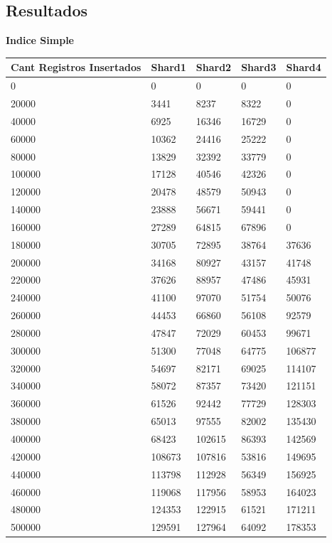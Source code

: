 \pagebreak

\subsection{Resultados}
\textbf{Indice Simple} \\
\begin{tabular}{ | l | l | l | l | l | }
\hline
	Cant Registros Insertados & Shard1 & Shard2 & Shard3 & Shard4 \\ \hline
	0 & 0 & 0 & 0 & 0 \\ \hline
	20000 & 3441 & 8237 & 8322 & 0 \\ \hline
	40000 & 6925 & 16346 & 16729 & 0 \\ \hline
	60000 & 10362 & 24416 & 25222 & 0 \\ \hline
	80000 & 13829 & 32392 & 33779 & 0 \\ \hline
	100000 & 17128 & 40546 & 42326 & 0 \\ \hline
	120000 & 20478 & 48579 & 50943 & 0 \\ \hline
	140000 & 23888 & 56671 & 59441 & 0 \\ \hline
	160000 & 27289 & 64815 & 67896 & 0 \\ \hline
	180000 & 30705 & 72895 & 38764 & 37636 \\ \hline
	200000 & 34168 & 80927 & 43157 & 41748 \\ \hline
	220000 & 37626 & 88957 & 47486 & 45931 \\ \hline
	240000 & 41100 & 97070 & 51754 & 50076 \\ \hline
	260000 & 44453 & 66860 & 56108 & 92579 \\ \hline
	280000 & 47847 & 72029 & 60453 & 99671 \\ \hline
	300000 & 51300 & 77048 & 64775 & 106877 \\ \hline
	320000 & 54697 & 82171 & 69025 & 114107 \\ \hline
	340000 & 58072 & 87357 & 73420 & 121151 \\ \hline
	360000 & 61526 & 92442 & 77729 & 128303 \\ \hline
	380000 & 65013 & 97555 & 82002 & 135430 \\ \hline
	400000 & 68423 & 102615 & 86393 & 142569 \\ \hline
	420000 & 108673 & 107816 & 53816 & 149695 \\ \hline
	440000 & 113798 & 112928 & 56349 & 156925 \\ \hline
	460000 & 119068 & 117956 & 58953 & 164023 \\ \hline
	480000 & 124353 & 122915 & 61521 & 171211 \\ \hline
	500000 & 129591 & 127964 & 64092 & 178353 \\ \hline
\end{tabular} \\
